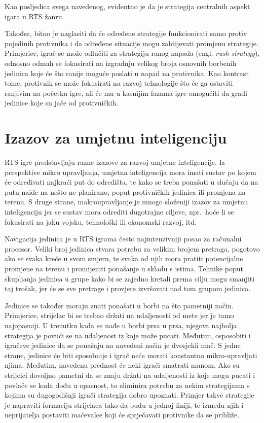 \documentclass[times, utf8, zavrsni, numeric]{fer}
\begin{document}
\par Kao posljedica svega navedenog, evidentno je da je strategija centralnih aspekt igara u RTS žanru. 

\par Također, bitno je naglasiti da će određene strategije funkcionirati samo protiv pojedinih protivnika i da određene situacije mogu zahtijevati promjenu strategije. 
Primjerice, igrač se može odlučiti za strategiju ranog napada (engl. \textit{rush strategy}), odnosno odmah se fokusirati na izgradnju velikog broja osnovnih borbenih jedinica koje će što ranije moguće poslati u napad na protivnika.
Kao kontrast tome, protivnik se može fokusirati na razvoj tehnologije što će ga ostaviti ranjivim na početku igre, ali će mu u kasnijim fazama igre omogućiti da gradi jedinice koje su jače od protivničkih.

\section{Izazov za umjetnu inteligenciju}

\par RTS igre predstavljaju razne izazove za razvoj umjetne inteligencije. 
Iz perspektive mikro upravljanja, umjetna inteligencija mora imati sustav po kojem će određivati najkraći put do odredišta, te kako se treba ponašati u slučaju da na putu naiđe na nešto ne planirano, poput protivničkih jedinica ili promjena na terenu. 
S druge strane, makroupravljanje je mnogo složeniji izazov za umjetnu inteligenciju jer se sustav mora odrediti dugotrajne ciljeve, npr.\ hoće li se fokusirati na jaku vojsku, tehnološki ili ekonomski razvoj, itd.

\par Navigacija jedinica je u RTS igrama često najintenzivniji posao za računalni procesor.
Veliki broj jedinica stvara potrebu za velikim brojem pretraga, pogotovo ako se svaka kreće u svom smjeru, te svaka od njih mora pratiti potencijalne promjene na terenu i promijeniti ponašanje u skladu s istima.
Tehnike poput skupljanja jedinica u grupe kako bi se zajedno kretali prema cilju mogu smanjiti taj trošak, jer će se sve pretrage i provjere izvršavati nad tom grupom jedinica\cite{book:AIGameProgrammingWisdom}.

\par Jedinice se također moraju znati ponašati u borbi na što pametniji način. Primjerice, strijelac bi se trebao držati na udaljenosti od mete jer je tamo najopasniji.
U trenutku kada se nađe u borbi prsa u prsa, njegova najbolja strategija je povući se na udaljenost iz koje može pucati.
Međutim, osposobiti i igračeve jedinice da se ponašaju na navedeni način  je dvosjekli mač.
S jedne strane, jedinice će biti sposobnije i igrač neće morati konstantno mikro-upravljati njima.
Međutim, navedenu prednost će neki igrači smatrati manom.
Ako su strijelci dovoljno pametni da se znaju držati na udaljenosti iz koje mogu pucati i povlače se kada dođu u opasnost, to eliminira potrebu za nekim strategijama s kojima su dugogodišnji igrači strategija dobro upoznati.
Primjer takve strategije je napraviti formaciju strijelaca tako da budu u jednoj liniji, te između njih i neprijatelja postaviti mačevalce koji će sprječavati protivnike da se približe.
\end{document}
